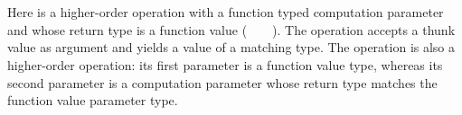 \begin{code}[hide]%
%
\>[6]\AgdaSpace{}%
\AgdaSymbol{\{}\AgdaSymbol{\}}\AgdaSpace{}%
\AgdaSymbol{\{}\AgdaSymbol{\}}\AgdaSpace{}%
\AgdaSpace{}%
\AgdaSymbol{=}\AgdaSpace{}%
\AgdaSpace{}%
\AgdaSymbol{(}\AgdaSpace{}%
\AgdaSymbol{\{}\AgdaSpace{}%
\AgdaSymbol{=}\AgdaSpace{}%
\AgdaSpace{}%
\AgdaSymbol{\AgdaUnderscore{}\}}\AgdaSpace{}%
\AgdaSymbol{(}\AgdaSpace{}%
\AgdaSymbol{\{}\AgdaSymbol{\}}\AgdaSpace{}%
\AgdaSymbol{\{}\AgdaSymbol{\}}\AgdaSpace{}%
\AgdaOperator{\AgdaInductiveConstructor{,}}\AgdaSpace{}%
\AgdaSpace{}%
\AgdaOperator{\AgdaInductiveConstructor{,}}\AgdaSpace{}%
\AgdaSymbol{))}\<%
\\
%
\>[6]\AgdaSpace{}%
\AgdaSpace{}%
\AgdaSymbol{=}\AgdaSpace{}%
\AgdaSpace{}%
\AgdaSymbol{(}\AgdaSpace{}%
\AgdaSymbol{\{}\AgdaSpace{}%
\AgdaSymbol{=}\AgdaSpace{}%
\AgdaSpace{}%
\AgdaSymbol{\AgdaUnderscore{}\}}\AgdaSpace{}%
\AgdaSymbol{(}\AgdaSpace{}%
\AgdaSpace{}%
\AgdaOperator{\AgdaInductiveConstructor{,}}\AgdaSpace{}%
\AgdaSpace{}%
\AgdaOperator{\AgdaInductiveConstructor{,}}\AgdaSpace{}%
\AgdaSpace{}%
\AgdaSymbol{()))}\<%
\\
%
\>[6]\AgdaSpace{}%
\AgdaSpace{}%
\AgdaSpace{}%
\AgdaSymbol{=}\AgdaSpace{}%
\AgdaSpace{}%
\AgdaSymbol{(}\AgdaSpace{}%
\AgdaSymbol{\{}\AgdaSpace{}%
\AgdaSymbol{=}\AgdaSpace{}%
\AgdaSpace{}%
\AgdaSymbol{\AgdaUnderscore{}\}}\AgdaSpace{}%
\AgdaSymbol{(}\AgdaSpace{}%
\AgdaSpace{}%
\AgdaOperator{\AgdaInductiveConstructor{,}}\AgdaSpace{}%
\AgdaSpace{}%
\AgdaOperator{\AgdaInductiveConstructor{,}}\AgdaSpace{}%
\AgdaSpace{}%
\AgdaBound{\AgdaUnderscore{}}\AgdaSpace{}%
\AgdaSpace{}%
\AgdaSymbol{))}\<%
\end{code}
%
Here  is a higher-order operation with a function typed computation parameter and whose return type is a function value (~~~~).
The  operation accepts a thunk value as argument and yields a value of a matching type.
The  operation is also a higher-order operation: its first parameter is a function value type, whereas its second parameter is a computation parameter whose return type matches the function value parameter type.

